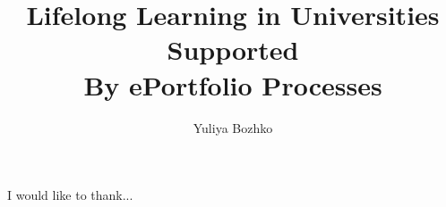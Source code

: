 \documentclass[11pt,PhD,twoside,openright]{muthesis}
\begin{document}



\title{Lifelong Learning in Universities Supported\\ 
  By ePortfolio Processes}
\author{Yuliya Bozhko}

\beforeabstract

 


\newpage
\cleardoublepage
 
I would like to thank...

\newpage
\cleardoublepage

 

\newpage
\cleardoublepage

 

\newpage
\cleardoublepage
 
\tableofcontents
\newpage
\iftablespage
	\addvspace{10pt}
    \listoftables 
    \newpage
\fi
\iffigurespage
	\addvspace{10pt}
    \listoffigures
    \newpage
\fi

\afterpreface

\pagestyle{fancy}

\fancyhead{}
\fancyhead[LE,LO]{\slshape \leftmark}

\fancyfoot{} 
\fancyfoot[LE,RO]{\thepage} 
\renewcommand{\headrulewidth}{0.4pt}
\renewcommand{\footrulewidth}{0pt}


 


 
 
 
 
 

\cleardoublepage
{} 
{}
             

\appendix







\end{document}
